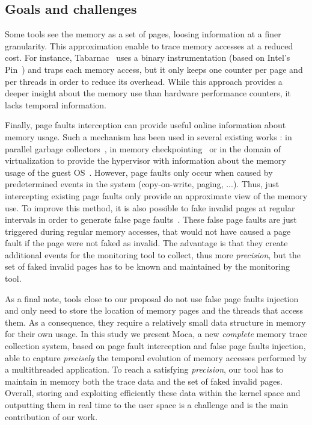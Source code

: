 \subsection{Goals and challenges}


Some tools see the memory as a set of pages, loosing information at a finer
granularity. This approximation enable to trace memory accesses at a reduced
cost. For instance, \gls{Tabarnac}~\cite{Beniamine15TABARNAC} uses a binary
instrumentation (based on Intel's Pin~\cite{Luk05Pin}) and traps each
memory access, but it only keeps one counter per page and per threads in order to
reduce its overhead. While this approach provides a deeper insight about the
memory use than hardware performance counters, it lacks temporal information.





Finally, page faults interception can provide useful online information about memory usage.
Such a mechanism has been used in several existing works : in parallel garbage collectors~\cite{Boehm91Mostly}, in memory checkpointing~\cite{Heo05Spaceefficient} or in the domain of virtualization to provide the hypervisor with information about the memory usage of the guest \gls{OS}~\cite{Jones06Geiger}.
However, page faults only occur when caused by predetermined events in the system (copy-on-write, paging, ...).
Thus, just intercepting existing page faults only provide an approximate view of the memory use.
To improve this method, it is also possible to fake invalid pages at regular intervals in order to generate false page faults~\cite{Bae12Dynamic,Diener13CommunicationBased}.
 These false page faults are just triggered during regular memory accesses, that would not have caused a page fault if the page were not faked as invalid.
The advantage is that they create additional events for the monitoring tool to collect, thus more \emph{precision}, but the set of faked invalid pages has to be known and maintained by the monitoring tool.

As a final note, tools close to our proposal do not use false page faults injection and only need to store the location of memory pages and the threads that access them.
As a consequence, they require a relatively small data structure in memory for their own usage.
In this study we present \gls{Moca}, a new \emph{complete} memory trace collection system, based on page fault interception and false page faults injection, able to capture \emph{precisely} the temporal evolution of memory accesses performed by a multithreaded application.
To reach a satisfying \emph{precision}, our tool has to maintain in memory both the trace data and the set of faked invalid pages.
Overall, storing and exploiting efficiently these data within the kernel space and outputting them in real time to the user space is a challenge and is the main contribution of our work.



